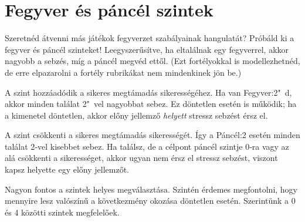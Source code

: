\section{Fegyver és páncél szintek}

Szeretnéd átvenni más játékok fegyverzet szabályainak hangulatát? Próbáld ki a fegyver és páncél szinteket! Leegyszerűsítve, ha eltalálnak egy fegyverrel, akkor nagyobb a sebzés, míg a páncél megvéd ettől. (Ezt fortélyokkal is modellezhetnéd, de erre elpazarolni a fortély rubrikákat nem mindenkinek jön be.)

A  szint hozzáadódik a sikeres megtámadás sikerességéhez. Ha van Fegyver:2"~d, akkor minden találat 2"~vel nagyobbat sebez. Ez döntetlen esetén is működik; ha a kimenetel döntetlen, akkor előny jellemző \emph{helyett} stressz sebzést érsz el.

A  szint csökkenti a sikeres megtámadás sikerességét. Így a Páncél:2 esetén minden találat 2‑vel kisebbet sebez. Ha találsz, de a célpont páncél szintje 0‑ra vagy az alá csökkenti a sikerességet, akkor ugyan nem érsz el stressz sebzést, viszont kapsz helyette egy előny jellemzőt.

Nagyon fontos a szintek helyes megválasztása. Szintén érdemes megfontolni, hogy mennyire lesz valószínű a következmény okozása döntetlen esetén. Szerintünk a 0 és 4 közötti szintek megfelelőek.
